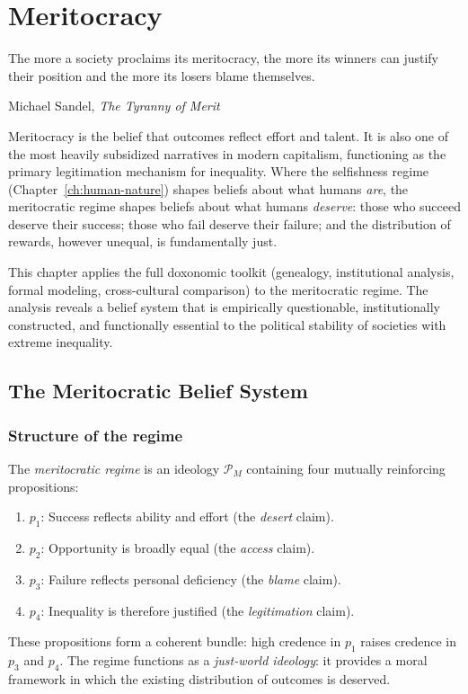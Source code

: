 \chapter{Meritocracy}
\label{ch:meritocracy}

\epigraph{The more a society proclaims its meritocracy, the more its winners can justify their position and the more its losers blame themselves.}{Michael Sandel, \textit{The Tyranny of Merit}}

\noindent
Meritocracy is the belief that outcomes reflect effort and talent.
It is also one of the most heavily subsidized narratives in modern capitalism, functioning as the primary legitimation mechanism for inequality.
Where the selfishness regime (Chapter~\ref{ch:human-nature}) shapes beliefs about what humans \emph{are}, the meritocratic regime shapes beliefs about what humans \emph{deserve}: those who succeed deserve their success; those who fail deserve their failure; and the distribution of rewards, however unequal, is fundamentally just.

This chapter applies the full doxonomic toolkit (genealogy, institutional analysis, formal modeling, cross-cultural comparison) to the meritocratic regime.
The analysis reveals a belief system that is empirically questionable, institutionally constructed, and functionally essential to the political stability of societies with extreme inequality.

\section{The Meritocratic Belief System}
\label{sec:ch22-system}

\subsection{Structure of the regime}

\begin{definition}
\label{def:meritocratic-regime}
The \emph{meritocratic regime} is an ideology $\mathcal{P}_M$ containing four mutually reinforcing propositions:
\begin{enumerate}[nosep]
  \item $p_1$: Success reflects ability and effort (the \emph{desert} claim).
  \item $p_2$: Opportunity is broadly equal (the \emph{access} claim).
  \item $p_3$: Failure reflects personal deficiency (the \emph{blame} claim).
  \item $p_4$: Inequality is therefore justified (the \emph{legitimation} claim).
\end{enumerate}
These propositions form a coherent bundle: high credence in $p_1$ raises credence in $p_3$ and $p_4$.
The regime functions as a \emph{just-world ideology}: it provides a moral framework in which the existing distribution of outcomes is deserved.
\end{definition}

